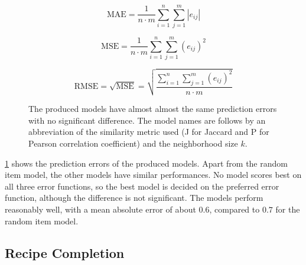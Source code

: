 \begin{equation}
	\textrm{MAE}=\frac{1}{n \cdot m}\sum_{i=1}^{n}\sum_{j=1}^{m}|e_{ij}|	
\end{equation}

\begin{equation}
	\textrm{MSE}=\frac{1}{n \cdot m}\sum_{i=1}^{n}\sum_{j=1}^{m}(e_{ij})^2
\end{equation}

\begin{equation}
	\mathrm{RMSE}= \sqrt{\mathrm{MSE}} = \sqrt{\frac{\sum_{i=1}^{n}\sum_{j=1}^{m}(e_{ij})^{2}}{n \cdot m}}
\end{equation}

\begin{figure}[htbp]
	\centering

	
	
	\caption{The produced models have almost almost the same prediction errors with no significant difference. The model names are follows by an abbreviation of the similarity metric used (J for Jaccard and P for Pearson correlation coefficient) and the neighborhood size $k$.}
	\label{fig:ratings_prediction_error}
\end{figure}

\cref{fig:ratings_prediction_error} shows the prediction errors of the produced models.
Apart from the random item model, the other models have similar performances.
No model scores best on all three error functions, so the best model is decided on the preferred error function, although the difference is not significant.
The models perform reasonably well, with a mean absolute error of about $0.6$, compared to $0.7$ for the random item model.




\subsection{Recipe Completion}
\label{subsec:recipe_completion}

